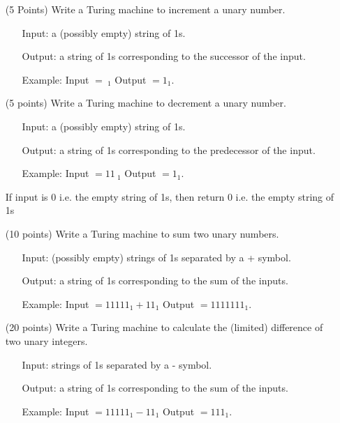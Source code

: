 \documentclass[11pt]{report}
\begin{document}
	\begin{enumerate}
		\item[(5 Points)] Write a Turing machine to increment a unary number. 
		
			\begin{itemize}
				\item[] Input: a (possibly empty) string of 1s.
				\item[] Output: a string of 1s corresponding to the successor of the input. 
				\item[] Example: Input $= \ _{1}$ Output $= 1_{1}$.
			\end{itemize}

		\item[(5 points)] Write a Turing machine to decrement a unary number. 
		
			\begin{itemize}
				\item[] Input: a (possibly empty) string of 1s.
				\item[] Output: a string of 1s corresponding to the predecessor of the input. 
				\item[] Example: Input $=11\ _{1}$ Output $= 1_{1}$.
			\end{itemize}
		
			If input is 0 i.e. the empty string of 1s, then return 0 i.e. the empty string of 1s 
		
		\item[(10 points)] Write a Turing machine to sum two unary numbers.
	
			\begin{itemize}
				\item[] Input: (possibly empty) strings of 1s separated by a + symbol.
				\item[] Output: a string of 1s corresponding to the sum of the inputs. 
				\item[] Example: Input $= 11111_{1} + 11_{1}$ Output $= 1111111_{1}$.
			\end{itemize}

		\item[(20 points)] Write a Turing machine to calculate the (limited) difference of two unary integers.
	
			\begin{itemize}
				\item[] Input: strings of 1s separated by a - symbol.
				\item[] Output: a string of 1s corresponding to the sum of the inputs. 
				\item[] Example: Input $= 11111_{1} - 11_{1}$ Output $= 111_{1}$.
			\end{itemize}


\end{enumerate}
\end{document}
